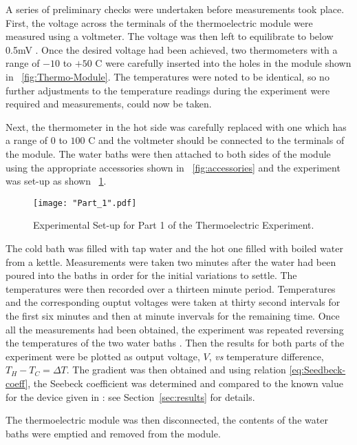 \documentclass{article}
\newcommand{\figref}[2][\figurename~]{#1\ref{#2}}
\newcommand{\secref}[2][Section~]{#1\ref{#2}}
\begin{document}
A series of preliminary checks were undertaken before measurements took place. First, the voltage across the terminals of the thermoelectric module were measured using a voltmeter. The voltage was then left to equilibrate to below 0.5mV \cite{Paper02}. Once the desired voltage had been achieved, two thermometers with a range of $-10$ to $+50$ C were carefully inserted into the holes in the module shown in \figref{fig:Thermo-Module}. The temperatures were noted to be identical, so no further adjustments to the temperature readings during the experiment were required and measurements, could now be taken.

\vspace{2mm}  
\noindent
Next, the thermometer in the hot side was carefully replaced with one which has a range of $0$ to $100$ C and the voltmeter should be connected to the terminals of the module. The water baths were then attached to both sides of the module using the appropriate accessories shown in \figref{fig:accessories} and the experiment was set-up as shown \figref{fig:part1}.

\begin{figure}[h]
\centering
\texttt{[image: "Part\_1".pdf]}
\caption{Experimental Set-up for Part 1 of the Thermoelectric Experiment.}
\label{fig:part1}
\end{figure}

\vspace{2mm}  
\noindent
The cold bath was filled with tap water and the hot one filled with boiled water from a kettle. Measurements were taken two minutes after the water had been poured into the baths in order for the initial variations to settle. The temperatures were then recorded over a thirteen minute period. Temperatures and the corresponding ouptut voltages were taken at thirty second intervals for the first six minutes and then at minute invervals for the remaining time. Once all the measurements had been obtained, the experiment was repeated reversing the temperatures of the two water baths \cite{Paper02}. Then the results for both parts of the experiment were be plotted as output voltage, $V$, \textit{vs} temperature difference, $T_H - T_C = \Delta T$. The gradient was then obtained and using relation \eqref{eq:Seedbeck-coeff}, the Seebeck coefficient was determined and compared to the known value for the device given in \cite{Paper02}: see \secref{sec:results} for details.

\vspace{2mm}  
\noindent
The thermoelectric module was then disconnected, the contents of the water baths were emptied and removed from the module. 
\end{document}

